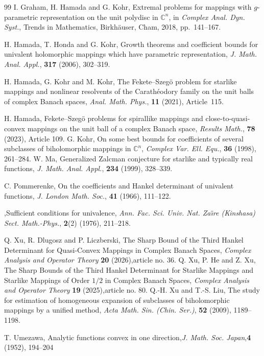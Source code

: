 \documentclass[11pt, reqno]{amsart}
\numberwithin{equation}{section}
\begin{document}
\begin{thebibliography}{99}
 {\sc I. Graham, H. Hamada and G. Kohr}, Extremal problems for mappings with $g$-parametric representation on the unit polydisc in $\mathbb{C}^{n}$,
in \textit{Complex Anal. Dyn. Syst.}, Trends in Mathematics, Birkh\"{a}user, Cham, 2018, pp.~141--167.

 {\sc H. Hamada, T. Honda and G. Kohr}, Growth theorems and coefficient bounds for univalent holomorphic mappings which have parametric representation, \textit{J. Math. Anal. Appl.}, \textbf{317} (2006), 302--319.

 {\sc H. Hamada, G. Kohr and M. Kohr}, The Fekete--Szeg\"o problem for starlike mappings and nonlinear resolvents of the Carath\'eodory family on the unit balls of complex Banach spaces,
\textit{Anal. Math. Phys.}, \textbf{11} (2021), Article~115.

 {\sc H. Hamada}, Fekete--Szeg\"o problems for spirallike mappings and close-to-quasi-convex mappings on the unit ball of a complex Banach space, \textit{Results Math.}, \textbf{78} (2023), Article 109.
 {\sc G. Kohr}, On some best bounds for coefficients of several subclasses of biholomorphic mappings in $\mathbb{C}^{n}$, \textit{Complex Var. Ell. Equ.}, \textbf{36} (1998), 261--284.
 {\sc W. Ma}, Generalized Zalcman conjecture for starlike and typically real functions, \textit{J. Math. Anal. Appl.}, \textbf{234} (1999), 328--339.


 {\sc C. Pommerenke}, On the coefficients and Hankel determinant of univalent functions, \textit{J. London Math. Soc.},
\textbf{41} (1966), 111--122.

,Sufficient conditions for univalence, \textit{Ann. Fac. Sci. Univ. Nat. Za\"{\i}re (Kinshasa) Sect. Math.-Phys.}, \textbf{2}(2) (1976), 211--218.

 {\sc Q. Xu, R. Dlugosz and P. Liczberski}, The Sharp Bound of the Third Hankel Determinant for Quasi-Convex Mappings in Complex Banach Spaces, \textit{Complex Analysis and Operator Theory} \textbf{20} (2026),article no. 36.
 {\sc Q. Xu, P. He and Z. Xu}, The Sharp Bounds of the Third Hankel Determinant for Starlike Mappings and Starlike Mappings of Order $1/2$ in Complex Banach Spaces, \textit{Complex Analysis and Operator Theory} \textbf{19} (2025),article no. 80.
 {\sc Q.-H. Xu and T.-S. Liu}, The study for estimation of homogeneous expansion of subclasses of biholomorphic mappings by a unified method, \textit{Acta Math. Sin. (Chin. Ser.)}, \textbf{52} (2009), 1189--1198.

 {\sc T. Umezawa}, Analytic functions convex in one direction,\textit{J. Math. Soc. Japan},\textbf{4} (1952), 194--204

\end{thebibliography}
\end{document}
